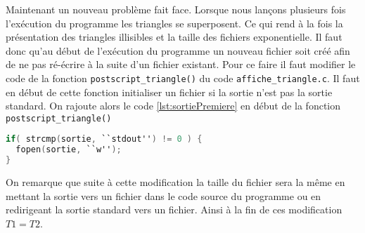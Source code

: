 Maintenant un nouveau problème fait face.
Lorsque nous lançons plusieurs fois l'exécution du programme les triangles se superposent.
Ce qui rend à la fois la présentation des triangles illisibles et la taille des fichiers exponentielle.
Il faut donc qu'au début de l'exécution du programme un nouveau fichier soit créé afin de ne pas ré-écrire à la suite d'un fichier existant.
Pour ce faire il faut modifier le code de la fonction \verb!postscript_triangle()! du code \verb!affiche_triangle.c!.
Il faut en début de cette fonction initialiser un fichier si la sortie n'est pas la sortie standard.
On rajoute alors le code \ref{lst:sortiePremiere} en début de la fonction \verb!postscript_triangle()!

\begin{lstlisting}[language=C, label={lst:sortiePremiere}, caption={Initialisation du fichier de sortie.}]
if( strcmp(sortie, ``stdout'') != 0 ) {
  fopen(sortie, ``w'');
}
\end{lstlisting}

On remarque que suite à cette modification la taille du fichier sera la même en mettant la sortie vers un fichier dans le code source du programme ou en redirigeant la sortie standard vers un fichier.
Ainsi à la fin de ces modification $T1=T2$.

